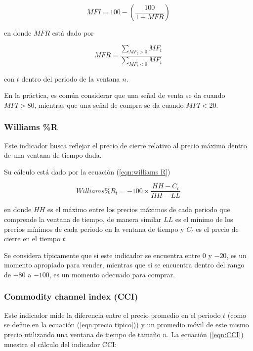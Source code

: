\documentclass[12pt]{report}
\theoremstyle{break}
\theoremstyle{break}
\begin{document}
\begin{equation} \label{eqn:MFI}
MFI = 100 - \left( \frac{100}{1 + MFR} \right)
\end{equation}

en donde $MFR$ está dado por 

\begin{equation} \label{eqn:MFR}
MFR = \dfrac{\sum_{MF_t > 0} MF_t  }{\sum_{MF_t < 0} MF_t}
\end{equation}

con $t$ dentro del periodo de la ventana $n$.

En la práctica, es común considerar que una señal de venta se da cuando $MFI > 80$, mientras que una señal de compra se da cuando $MFI < 20$.

\subsubsection{Williams \%R}
\label{subsubseccion:Williams R}
Este indicador busca reflejar el precio de cierre relativo al precio máximo dentro de una ventana de tiempo dada.

Su cálculo está dado por la ecuación (\ref{eqn:williams R})

\begin{equation} \label{eqn:williams R}
Williams \%R_t = -100 \times \dfrac{HH - C_t}{HH - LL}
\end{equation}

en donde $HH$ es el máximo entre los precios máximos de cada periodo que comprende la ventana de tiempo, de manera similar $LL$ es el mínimo de los precios mínimos de cada periodo en la ventana de tiempo y $C_t$ es el precio de cierre en el tiempo $t$.

Se considera típicamente que si este indicador se encuentra entre $0$ y $-20$, es un momento apropiado para vender, mientras que si se encuentra dentro del rango de $-80$ a $-100$, es un momento adecuado para comprar.

\subsubsection{Commodity channel index (CCI)}
\label{subsubseccion:cci}
Este indicador mide la diferencia entre el precio promedio en el periodo $t$ (como se define en la ecuación (\ref{eqn:precio tipico})) y un promedio móvil de este mismo precio utilizando una ventana de tiempo de tamaño $n$. La ecuación (\ref{eqn:CCI}) muestra el cálculo del indicador CCI:
\end{document}
